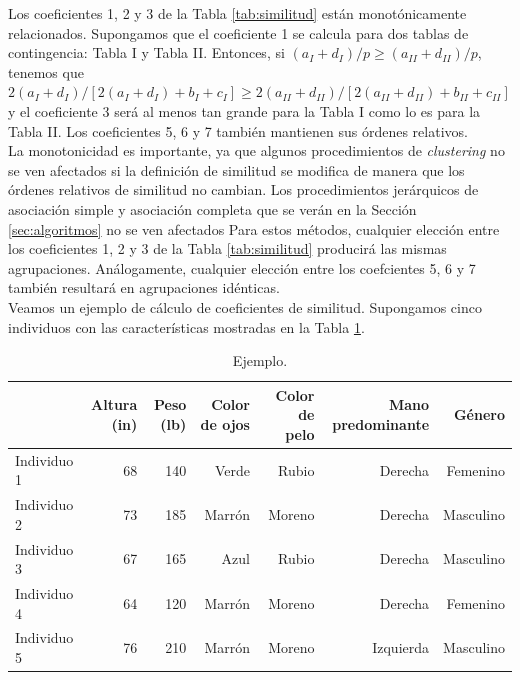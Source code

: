 \documentclass[a4paper, 20pt]{article}
\begin{document}
Los coeficientes 1, 2 y 3 de la Tabla \ref{tab:similitud} están monotónicamente relacionados. Supongamos que el coeficiente 1 se calcula para dos tablas de contingencia: Tabla I y Tabla II. Entonces, si $(a_I+d_I)/p \geq (a_{II}+d_{II})/p$, tenemos que $2(a_I+d_I)/[2(a_I+d_I)+b_I+c_I] \geq 2(a_{II}+d_{II})/[2(a_{II}+d_{II})+b_{II}+c_{II}]$ y el coeficiente 3 será al menos tan grande para la Tabla I como lo es para la Tabla II. Los coeficientes 5, 6 y 7 también mantienen sus órdenes relativos.\\

La monotonicidad es importante, ya que algunos procedimientos de \textit{clustering} no se ven afectados si la definición de similitud se modifica de manera que los órdenes relativos de similitud no cambian. Los procedimientos jerárquicos de asociación simple y asociación completa que se verán en la Sección \ref{sec:algoritmos} no se ven afectados Para estos métodos, cualquier elección entre los coeficientes 1, 2 y 3 de la Tabla \ref{tab:similitud} producirá las mismas agrupaciones. Análogamente, cualquier elección entre los coefcientes 5, 6 y 7 también resultará en agrupaciones idénticas.\\ %

Veamos un ejemplo de cálculo de coeficientes de similitud. Supongamos cinco individuos con las características mostradas en la Tabla \ref{tab:ej-similitud}.

\begin{table}[h]
  \centering
  \caption{Ejemplo.}
  \label{tab:ej-similitud}
\resizebox{15cm}{!} {
  \begin{tabular}{lrrrrrr}
    \toprule
            & Altura (in) & Peso (lb) & Color de ojos & Color de pelo & Mano predominante & Género \\ \midrule
Individuo 1 & 68                       & 140                    & Verde                             & Rubio                             & Derecha                               & Femenino\\
Individuo 2 & 73 & 185 & Marrón & Moreno & Derecha & Masculino                  \\
Individuo 3 & 67 & 165 & Azul & Rubio & Derecha & Masculino                  \\
Individuo 4 & 64 & 120 & Marrón & Moreno                            & Derecha & Femenino \\
Individuo 5 & 76 & 210 & Marrón & Moreno & Izquierda & Masculino                 
\end{tabular}
}
\end{table}
\end{document}
